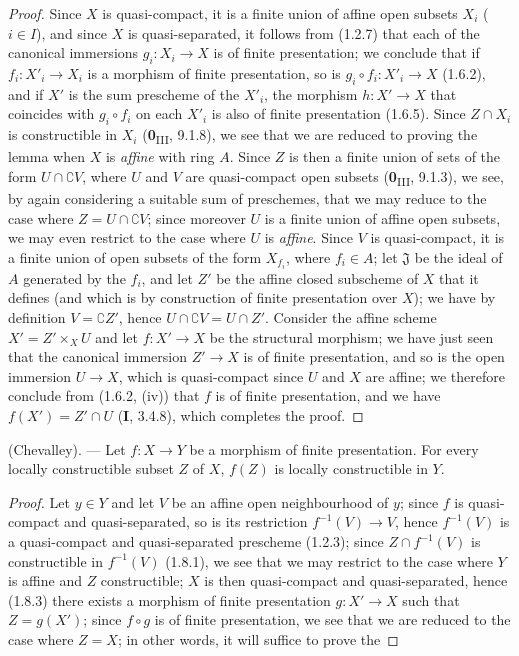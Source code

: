 \begin{proof}
Since $X$ is quasi-compact, it is a finite union of affine open subsets $X_i$
($i\in I$), and since $X$ is quasi-separated, it follows from (1.2.7) that
each of the canonical immersions $g_i:X_i\to X$ is of finite presentation; we
conclude that if $f_i:X'_i\to X_i$ is a morphism of finite presentation, so
is $g_i\circ f_i:X'_i\to X$ (1.6.2), and if $X'$ is the sum prescheme of the
$X'_i$, the morphism $h:X'\to X$ that coincides with $g_i\circ f_i$ on each
$X'_i$ is also of finite presentation (1.6.5). Since $Z\cap X_i$ is
constructible in $X_i$ (\textbf{0}\textsubscript{III}, 9.1.8), we see that we are
reduced to proving the lemma when $X$ is \emph{affine} with ring $A$. Since
$Z$ is then a finite union of sets of the form $U\cap\complement V$, where
$U$ and $V$ are quasi-compact open subsets (\textbf{0}\textsubscript{III}, 9.1.3), we
see, by again considering a suitable sum of preschemes, that we may reduce to
the case where $Z=U\cap\complement V$; since moreover $U$ is a finite union
of affine open subsets, we may even restrict to the case where $U$ is
\emph{affine}. Since $V$ is quasi-compact, it is a finite union of open
subsets of the form $X_{f_i}$, where $f_i\in A$; let $\mathfrak J$ be the
ideal of $A$ generated by the $f_i$, and let $Z'$ be the affine closed
subscheme of $X$ that it defines (and which is by construction of finite
presentation over $X$); we have by definition $V=\complement Z'$, hence
$U\cap\complement V=U\cap Z'$. Consider the affine scheme $X'=Z'\times_XU$
and let $f:X'\to X$ be the structural morphism; we have just seen that
the canonical immersion $Z'\to X$ is of finite presentation, and so is
the open immersion $U\to X$, which is quasi-compact since $U$ and
$X$ are affine; we therefore conclude from (1.6.2, (iv)) that $f$ is of
finite presentation, and we have $f(X')=Z'\cap U$ (\textbf{I}, 3.4.8), which completes
the proof.
\end{proof}

\begin{theorem}[1.8.4]
\label{IV.1.8.4}
\textup{(Chevalley).} --- Let $f:X\to Y$ be a morphism of finite
presentation. For every locally constructible subset $Z$ of $X$, $f(Z)$ is
locally constructible in $Y$.
\end{theorem}

\begin{proof}
Let $y\in Y$ and let $V$ be an affine open neighbourhood of $y$; since $f$ is
quasi-compact and quasi-separated, so is its restriction
$f^{-1}(V)\to V$, hence $f^{-1}(V)$ is a quasi-compact and
quasi-separated prescheme (1.2.3); since $Z\cap f^{-1}(V)$ is constructible
in $f^{-1}(V)$ (1.8.1), we see that we may restrict to the case where $Y$ is
affine and $Z$ constructible; $X$ is then quasi-compact and quasi-separated,
hence (1.8.3) there exists a morphism of finite presentation $g:X'\to X$ such
that $Z=g(X')$; since $f\circ g$ is of finite presentation, we see that we
are reduced to the case where $Z=X$; in other words, it will suffice to
prove the
\end{proof}

